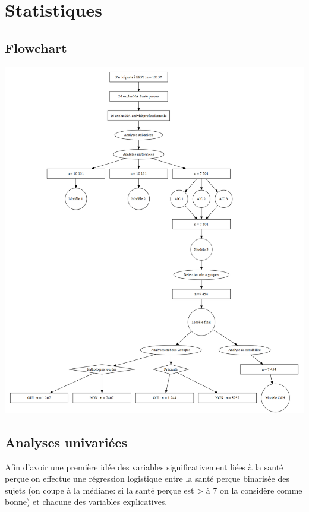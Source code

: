 \documentclass{book}
\begin{document}
\newpage
\section{Statistiques}
\subsection{Flowchart}

\begin{center}
\includegraphics[scale=.25]{flowchart.png}
\end{center}


\subsection{Analyses univariées}

\noindent
Afin d'avoir une première idée des variables significativement liées à la santé perçue on effectue une régression logistique entre la santé perçue binarisée des sujets (on coupe à la médiane: si la santé perçue est > à 7 on la considère comme bonne) et chacune des variables explicatives.\\
\end{document}
